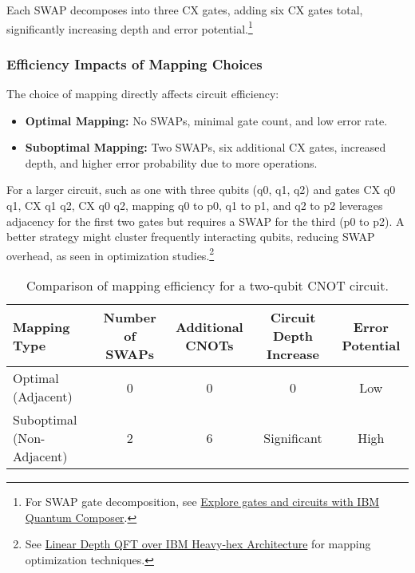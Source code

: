 {  Each SWAP decomposes into three CX gates, adding six CX gates total,
  significantly increasing depth and error potential.\footnote{For SWAP gate
    decomposition, see \href{https://learning.quantum.ibm.com/tutorial/explore-gates-and-circuits-with-the-quantum-composer}
  {Explore gates and circuits with IBM Quantum Composer}.}
}

\subsubsection*{Efficiency Impacts of Mapping Choices}

The choice of mapping directly affects circuit efficiency:

\begin{itemize}
  \item \textbf{Optimal Mapping:} No SWAPs, minimal gate count, and low error
    rate.
  \item \textbf{Suboptimal Mapping:} Two SWAPs, six additional CX gates,
    increased depth, and higher error probability due to more operations.
\end{itemize}

\vspace{0.3cm}

\noindent
For a larger circuit, such as one with three qubits (q0, q1, q2) and gates CX
q0 q1, CX q1 q2, CX q0 q2, mapping q0 to p0, q1 to p1, and q2 to p2 leverages
adjacency for the first two gates but requires a SWAP for the third (p0 to
p2). A better strategy might cluster frequently interacting qubits, reducing
SWAP overhead, as seen in optimization studies.\footnote{See
  \href{https://arxiv.org/html/2402.09705v1}{Linear Depth QFT over IBM
Heavy-hex Architecture} for mapping optimization techniques.}

\vspace{0.3cm}

\begin{center}
  \begin{table}[h]
    \centering
    \begin{tabular}{lcccc}
      \toprule
      Mapping Type & Number of SWAPs & Additional CNOTs & Circuit Depth Increase & Error Potential \\
      \midrule
      Optimal (Adjacent) & 0 & 0 & 0 & Low \\
      Suboptimal (Non-Adjacent) & 2 & 6 & Significant & High \\
      \bottomrule
    \end{tabular}
    \caption{Comparison of mapping efficiency for a two-qubit CNOT circuit.}
  \end{table}
\end{center}

